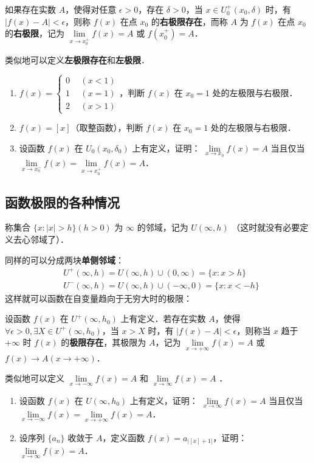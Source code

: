   如果存在实数 $A$，使得对任意 $\epsilon >0$，存在 $\delta>0$，当 $x\in U_0^+(x_0,\delta)$ 时，有 $|f(x)-A|<\epsilon$，则称 $f(x)$ 在点 $x_0$ 的\textbf{右极限存在}，而称 $A$ 为 $f(x)$ 在点 $x_0$ 的\textbf{右极限}，记为 $\lim\limits_{x\rightarrow x_0^+}f(x)=A$ 或 $f(x_0^+)=A$．

  类似地可以定义\textbf{左极限存在}和\textbf{左极限}．

\begin{exercise}{}
\begin{enumerate}
\item $f(x)=\left\{\begin{aligned} 0\ \ &(x<1)\\ 1\ \ &(x= 1)\\2\ \ &(x>1) \end{aligned}\right.$，判断 $f(x)$ 在 $x_0=1$ 处的左极限与右极限．
\item  $f(x)=[x]$（取整函数），判断 $f(x)$ 在 $x_0=1$ 处的左极限与右极限．
\item  设函数 $f(x)$ 在 $U_0(x_0,\delta_0)$ 上有定义，证明： $\lim\limits_{x\rightarrow x_0} f(x)=A$ 当且仅当 $\lim\limits_{x\rightarrow x_0^-}f(x)=\lim\limits_{x\rightarrow x_0^+}f(x)=A$．
\end{enumerate}
\end{exercise}

\subsection{函数极限的各种情况}
称集合 $\{x:|x|>h\}(h>0)$ 为 $\infty$ 的邻域，记为 $U(\infty,h)$ （这时就没有必要定义去心邻域了）．

同样的可以分成两块\textbf{单侧邻域}：
\begin{equation}
\begin{aligned}
&U^+(\infty,h)=U(\infty,h)\cup (0,\infty)=\{x:x>h\}\\
&U^-(\infty,h)=U(\infty,h)\cup (-\infty,0)=\{x:x<-h\}
\end{aligned}
\end{equation}
  这样就可以函数在自变量趋向于无穷大时的极限：

  设函数 $f(x)$ 在 $U^+(\infty,h_0)$ 上有定义．若存在实数 $A$，使得 $\forall \epsilon >0, \exists X\in U^+(\infty,h_0)$，当 $x>X$ 时，有 $|f(x)-A|<\epsilon$，则称当 $x$ 趋于 $+\infty$ 时 $f(x)$ 的\textbf{极限存在}，其极限为 $A$，记为 $\lim\limits_{x\rightarrow +\infty}f(x)=A$ 或 $f(x)\rightarrow A(x\rightarrow +\infty)$．

  类似地可以定义 $\lim\limits_{x\rightarrow -\infty}f(x)=A$ 和 $\lim\limits_{x\rightarrow \infty}f(x)=A$ ．
\begin{exercise}{}
\begin{enumerate}
\item 设函数 $f(x)$ 在 $U(\infty,h_0)$ 上有定义，证明： $\lim\limits_{x\rightarrow \infty} f(x)=A$ 当且仅当 $\lim\limits_{x\rightarrow -\infty}f(x)=\lim\limits_{x\rightarrow +\infty}f(x)=A$．
\item 设序列 $\{a_n\}$ 收敛于 $A$，定义函数 $f(x)=a_{|[x]+1|}$，证明：$\lim\limits_{x\rightarrow \infty} f(x)=A$．
\end{enumerate}
\end{exercise}

